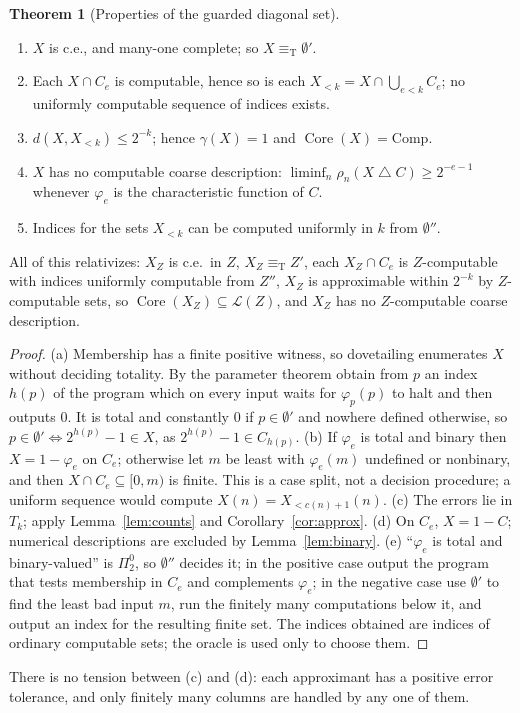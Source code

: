 \documentclass[11pt,letterpaper]{article}
\theoremstyle{definition}
\newtheorem{theorem}[definition]{Theorem}
\numberwithin{equation}{section}
\newcommand{\eqT}{\equiv_{\mathrm T}}
\newcommand{\Low}{\mathcal L}
\newcommand{\Core}{\operatorname{Core}}
\newcommand{\Comp}{\mathrm{Comp}}
\newcommand{\sd}{\mathbin{\triangle}}
\newcommand{\src}[1]{\leavevmode{\sffamily\footnotesize\color{Steel}[#1]}}
\begin{document}
\begin{theorem}[Properties of the guarded diagonal set]\label{thm:guarded}\src{R5, R8, R9}
\begin{enumerate}[label=\textup{(\alph*)}]
\item $X$ is c.e., and many-one complete; so $X\eqT\emptyset'$.
\item Each $X\cap C_e$ is computable, hence so is each $X_{<k}=X\cap\bigcup_{e<k}C_e$; no uniformly computable sequence of indices exists.
\item $d(X,X_{<k})\le2^{-k}$; hence $\gamma(X)=1$ and $\Core(X)=\Comp$.
\item $X$ has no computable coarse description: $\liminf_n\rho_n(X\sd C)\ge2^{-e-1}$ whenever $\varphi_e$ is the characteristic function of $C$.
\item Indices for the sets $X_{<k}$ can be computed uniformly in $k$ from $\emptyset''$.
\end{enumerate}
All of this relativizes: $X_Z$ is c.e.\ in $Z$, $X_Z\eqT Z'$, each $X_Z\cap C_e$ is $Z$-computable with indices uniformly computable from $Z''$, $X_Z$ is approximable within $2^{-k}$ by $Z$-computable sets, so $\Core(X_Z)\subseteq\Low(Z)$, and $X_Z$ has no $Z$-computable coarse description.
\end{theorem}
\begin{proof}
(a) Membership has a finite positive witness, so dovetailing enumerates $X$ without deciding totality. By the parameter theorem obtain from $p$ an index $h(p)$ of the program which on every input waits for $\varphi_p(p)$ to halt and then outputs $0$. It is total and constantly $0$ if $p\in\emptyset'$ and nowhere defined otherwise, so $p\in\emptyset'\iff2^{h(p)}-1\in X$, as $2^{h(p)}-1\in C_{h(p)}$. (b) If $\varphi_e$ is total and binary then $X=1-\varphi_e$ on $C_e$; otherwise let $m$ be least with $\varphi_e(m)$ undefined or nonbinary, and then $X\cap C_e\subseteq[0,m)$ is finite. This is a case split, not a decision procedure; a uniform sequence would compute $X(n)=X_{<c(n)+1}(n)$. (c) The errors lie in $T_k$; apply Lemma~\ref{lem:counts} and Corollary~\ref{cor:approx}. (d) On $C_e$, $X=1-C$; numerical descriptions are excluded by Lemma~\ref{lem:binary}. (e) ``$\varphi_e$ is total and binary-valued'' is $\Pi^0_2$, so $\emptyset''$ decides it; in the positive case output the program that tests membership in $C_e$ and complements $\varphi_e$; in the negative case use $\emptyset'$ to find the least bad input $m$, run the finitely many computations below it, and output an index for the resulting finite set. The indices obtained are indices of ordinary computable sets; the oracle is used only to choose them.
\end{proof}
There is no tension between (c) and (d): each approximant has a positive error tolerance, and only finitely many columns are handled by any one of them.
\end{document}

